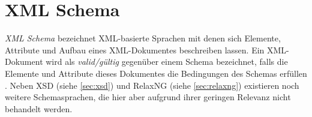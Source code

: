 \section{XML Schema}
\label{sec:xmlschema}

\emph{XML Schema} bezeichnet XML-basierte Sprachen mit denen sich Elemente, Attribute und Aufbau eines XML-Dokumentes beschreiben lassen. 
Ein XML-Dokument wird als \emph{valid/gültig} gegenüber einem Schema bezeichnet, falls die Elemente und Attribute dieses Dokumentes die Bedingungen des Schemas erfüllen \cite{taxonomyXMLSchema}.
Neben XSD (siehe \cref{sec:xsd}) und RelaxNG (siehe \cref{sec:relaxng}) existieren noch weitere Schemasprachen, die hier aber aufgrund ihrer geringen Relevanz nicht behandelt werden.



